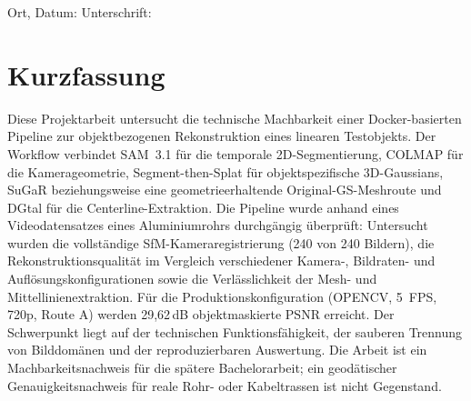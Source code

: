 \documentclass[12pt,a4paper]{article}
\newif\ifincludeappendices
\begin{document}
\vfill
\noindent Ort, Datum: \dotfill\hfill Unterschrift: \dotfill
\clearpage
\fi
\section*{Kurzfassung}
Diese Projektarbeit untersucht die technische Machbarkeit einer Docker-basierten Pipeline zur
objektbezogenen Rekonstruktion eines linearen Testobjekts. Der Workflow verbindet
SAM~3.1 für die temporale 2D-Segmentierung, COLMAP für die Kamerageometrie,
Segment-then-Splat für objektspezifische 3D-Gaussians, SuGaR beziehungsweise eine
geometrieerhaltende Original-GS-Meshroute und DGtal für die Centerline-Extraktion.
Die Pipeline wurde anhand eines Videodatensatzes eines Aluminiumrohrs durchgängig
überprüft: Untersucht wurden die vollständige SfM-Kameraregistrierung (240 von 240
Bildern), die Rekonstruktionsqualität im Vergleich verschiedener Kamera-,
Bildraten- und Auflösungskonfigurationen sowie die Verlässlichkeit der Mesh- und
Mittellinienextraktion. Für die Produktionskonfiguration (OPENCV, 5~FPS, 720p,
Route A) werden 29,62\,dB objektmaskierte PSNR erreicht. Der Schwerpunkt liegt
auf der technischen Funktionsfähigkeit, der sauberen Trennung von Bilddomänen
und der reproduzierbaren Auswertung. Die Arbeit ist ein Machbarkeitsnachweis für die spätere
Bachelorarbeit; ein geodätischer Genauigkeitsnachweis für reale Rohr- oder
Kabeltrassen ist nicht Gegenstand.
\clearpage

\tableofcontents
\clearpage
\listoffigures
\clearpage
\listoftables
\clearpage
{}











\printbibliography[heading=bibintoc,title={Literatur und Referenzen}]

\ifincludeappendices
\appendix







\fi
\end{document}
